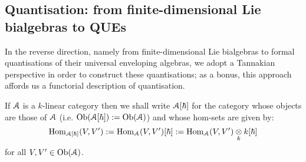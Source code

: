     \subsection{Quantisation: from finite-dimensional Lie bialgebras to QUEs}
        In the reverse direction, namely from finite-dimensional Lie bialgebras to formal quantisations of their universal enveloping algebras, we adopt a Tannakian perspective in order to construct these quantisations; as a bonus, this approach affords us a functorial description of quantisation. 
        
        \begin{convention}
            If $\mathcal{A}$ is a $k$-linear category then we shall write $\mathcal{A}[\hbar]$ for the category whose objects are those of $\mathcal{A}$ (i.e. $\mathrm{Ob}(\mathcal{A}[\hbar]) := \mathrm{Ob}(\mathcal{A})$) and whose hom-sets are given by:
                $$\Hom_{\calA[\hbar]}(V, V') := \Hom_{\calA}(V, V')[\hbar] := \Hom_{\calA}(V, V') \tensor_k k[\hbar]$$
            for all $V, V' \in \mathrm{Ob}(\mathcal{A})$.
        \end{convention}
        
